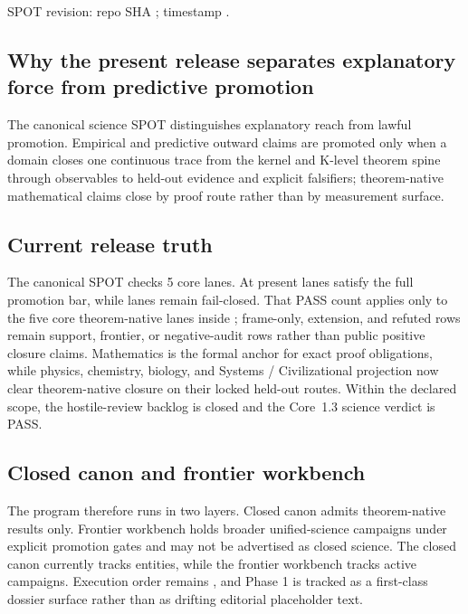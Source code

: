 SPOT revision: repo SHA ; timestamp .

\subsection{Why the present release separates explanatory force from predictive promotion}
The canonical science SPOT distinguishes explanatory reach from lawful promotion. Empirical and predictive outward claims are promoted only when a domain closes one continuous trace from the kernel and K-level theorem spine through observables to held-out evidence and explicit falsifiers; theorem-native mathematical claims close by proof route rather than by measurement surface.

\subsection{Current release truth}
The canonical SPOT checks 5 core lanes. At present  lanes satisfy the full promotion bar, while  lanes remain fail-closed.
That PASS count applies only to the five core theorem-native lanes inside ; frame-only, extension, and refuted rows remain support, frontier, or negative-audit rows rather than public positive closure claims.
Mathematics is the formal anchor for exact proof obligations, while physics, chemistry, biology, and Systems / Civilizational projection now clear theorem-native closure on their locked held-out routes. Within the declared  scope, the hostile-review backlog is closed and the Core~1.3 science verdict is PASS.

\subsection{Closed canon and frontier workbench}
The program therefore runs in two layers. Closed canon admits theorem-native results only. Frontier workbench holds broader unified-science campaigns under explicit promotion gates and may not be advertised as closed science.
The closed canon currently tracks  entities, while the frontier workbench tracks  active campaigns.
Execution order remains , and Phase 1 is tracked as a first-class dossier surface rather than as drifting editorial placeholder text.

